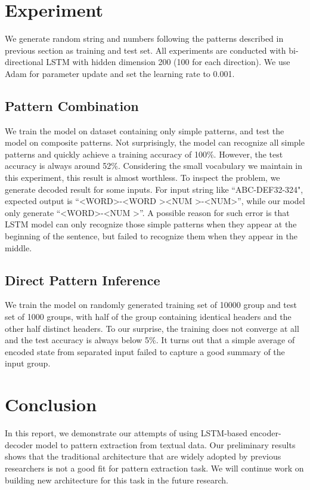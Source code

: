 \documentclass{article}
\begin{document}
\section{Experiment}\label{sec:experiment}
We generate random string and numbers following the patterns described in previous section as training and test set. All experiments are conducted with bi-directional LSTM with hidden dimension 200 (100 for each direction). We use Adam for parameter update and set the learning rate to 0.001.
\subsection{Pattern Combination}

We train the model on dataset containing only simple patterns, and test the model on composite patterns. Not surprisingly, the model can recognize all simple patterns and quickly achieve a training accuracy of 100\%. However, the test accuracy is always around 52\%. Considering the small vocabulary we maintain in this experiment, this result is almost worthless. To inspect the problem, we generate decoded result for some inputs. For input string like ``ABC-DEF32-324", expected output is ``\textless WORD\textgreater -\textless WORD \textgreater \textless NUM \textgreater -\textless NUM\textgreater'', while our model only generate ``\textless WORD\textgreater -\textless NUM \textgreater''. A possible reason for such error is that LSTM model can only recognize those simple patterns when they appear at the beginning of the sentence, but failed to recognize them when they appear in the middle. 

\subsection{Direct Pattern Inference}
We train the model on randomly generated training set of 10000 group and test set of 1000 groups, with half of the group containing identical headers and the other half distinct headers. To our surprise, the training does not converge at all and the test accuracy is always below 5\%. It turns out that a simple average of encoded state from separated input failed to capture a good summary of the input group.

\section{Conclusion}\label{sec:conclusion}
In this report, we demonstrate our attempts of using LSTM-based encoder-decoder model to  pattern extraction from textual data. Our preliminary results shows that the traditional architecture that are widely adopted by previous researchers is not a good fit for pattern extraction task. We will continue work on building new architecture for this task in the future research.


\end{document}
